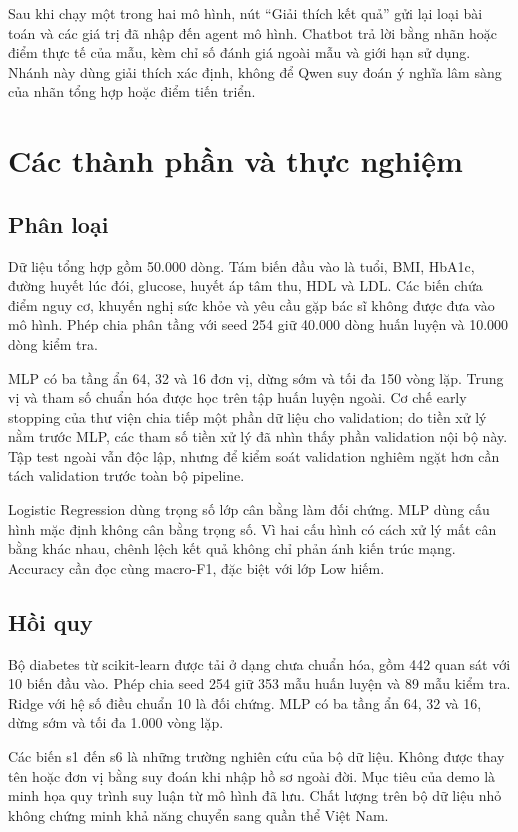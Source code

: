 Sau khi chạy một trong hai mô hình, nút ``Giải thích kết quả'' gửi lại loại bài toán và các giá trị đã nhập đến agent mô hình. Chatbot trả lời bằng nhãn hoặc điểm thực tế của mẫu, kèm chỉ số đánh giá ngoài mẫu và giới hạn sử dụng. Nhánh này dùng giải thích xác định, không để Qwen suy đoán ý nghĩa lâm sàng của nhãn tổng hợp hoặc điểm tiến triển.
\chapter{Các thành phần và thực nghiệm}
\section{Phân loại}
Dữ liệu tổng hợp gồm 50.000 dòng. Tám biến đầu vào là tuổi, BMI, HbA1c, đường huyết lúc đói, glucose, huyết áp tâm thu, HDL và LDL. Các biến chứa điểm nguy cơ, khuyến nghị sức khỏe và yêu cầu gặp bác sĩ không được đưa vào mô hình. Phép chia phân tầng với seed 254 giữ 40.000 dòng huấn luyện và 10.000 dòng kiểm tra.

MLP có ba tầng ẩn 64, 32 và 16 đơn vị, dừng sớm và tối đa 150 vòng lặp. Trung vị và tham số chuẩn hóa được học trên tập huấn luyện ngoài. Cơ chế early stopping của thư viện chia tiếp một phần dữ liệu cho validation; do tiền xử lý nằm trước MLP, các tham số tiền xử lý đã nhìn thấy phần validation nội bộ này. Tập test ngoài vẫn độc lập, nhưng để kiểm soát validation nghiêm ngặt hơn cần tách validation trước toàn bộ pipeline.

Logistic Regression dùng trọng số lớp cân bằng làm đối chứng. MLP dùng cấu hình mặc định không cân bằng trọng số. Vì hai cấu hình có cách xử lý mất cân bằng khác nhau, chênh lệch kết quả không chỉ phản ánh kiến trúc mạng. Accuracy cần đọc cùng macro-F1, đặc biệt với lớp Low hiếm.
\section{Hồi quy}
Bộ diabetes từ scikit-learn được tải ở dạng chưa chuẩn hóa, gồm 442 quan sát với 10 biến đầu vào. Phép chia seed 254 giữ 353 mẫu huấn luyện và 89 mẫu kiểm tra. Ridge với hệ số điều chuẩn 10 là đối chứng. MLP có ba tầng ẩn 64, 32 và 16, dừng sớm và tối đa 1.000 vòng lặp.

Các biến s1 đến s6 là những trường nghiên cứu của bộ dữ liệu. Không được thay tên hoặc đơn vị bằng suy đoán khi nhập hồ sơ ngoài đời. Mục tiêu của demo là minh họa quy trình suy luận từ mô hình đã lưu. Chất lượng trên bộ dữ liệu nhỏ không chứng minh khả năng chuyển sang quần thể Việt Nam.
